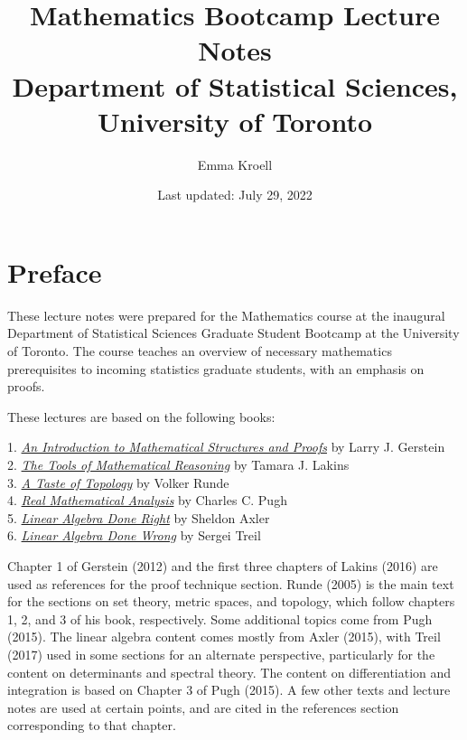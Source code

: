 \documentclass{article}
\title{Mathematics Bootcamp Lecture Notes \\
\vspace{0.5em}
\large Department of Statistical Sciences, University of Toronto}
\author{Emma Kroell}
\date{Last updated: July 29, 2022}
\begin{document}
\maketitle


\newpage
\section*{Preface}

These lecture notes were prepared for the Mathematics course at the inaugural Department of Statistical Sciences Graduate Student Bootcamp at the University of Toronto. The course teaches an overview of necessary mathematics prerequisites to incoming statistics graduate students, with an emphasis on proofs.


These lectures are based on the following books:

1. \href{https://link-springer-com.myaccess.library.utoronto.ca/book/10.1007/978-1-4614-4265-3}{{\emph{An Introduction to Mathematical Structures and Proofs}}} by Larry J. Gerstein \\
2. \href{https://bookstore.ams.org/amstext-26/}{{\emph{The Tools of Mathematical Reasoning}}} by Tamara J. Lakins \\
3. \href{https://link-springer-com.myaccess.library.utoronto.ca/book/10.1007/0-387-28387-0}{\emph{A Taste of Topology}} by Volker Runde \\
4. \href{https://link-springer-com.myaccess.library.utoronto.ca/book/10.1007/978-3-319-17771-7}{\emph{Real Mathematical Analysis}} by Charles C. Pugh \\
5. \href{https://link-springer-com.myaccess.library.utoronto.ca/book/10.1007/978-3-319-11080-6}{{\emph{Linear Algebra Done Right}}} by Sheldon Axler \\
6. \href{https://www.math.brown.edu/streil/papers/LADW/LADW.html}{{\emph{Linear Algebra Done Wrong}}} by Sergei Treil 

Chapter 1 of Gerstein (2012) and the first three chapters of Lakins (2016) are used as references for the proof technique section. Runde (2005) is the main text for the sections on set theory, metric spaces, and topology, which follow chapters 1, 2, and 3 of his book, respectively. Some additional topics come from Pugh (2015). The linear algebra content comes mostly from Axler (2015), with Treil (2017) used in some sections for an alternate perspective, particularly for the content on determinants and spectral theory. The content on differentiation and integration is based on Chapter 3 of Pugh (2015). A few other texts and lecture notes are used at certain points, and are cited in the references section corresponding to that chapter.
\end{document}
